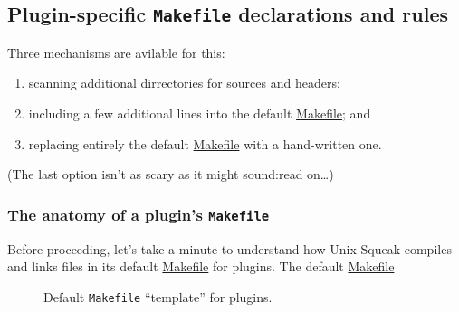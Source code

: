 \documentclass{article}
\newcommand{\cmd}{\url}
\newcommand{\cmd}{\texttt}
\begin{document}
\subsection{Plugin-specific \texttt{Makefile} declarations and rules}

Three
mechanisms are avilable for this:
\begin{enumerate}
\item scanning additional dirrectories for sources and headers;
\item including a few additional lines into the default \cmd{Makefile};
  and 
\item replacing entirely the default \cmd{Makefile} with a
  hand-written one.
\end{enumerate}
(The last option isn't as scary as it might sound:\@ read on\ldots)


\subsubsection{The anatomy of a plugin's \texttt{Makefile}}

Before proceeding, let's take a minute to understand how Unix Squeak
compiles and links files in its default \cmd{Makefile} for plugins.
The default
\cmd{Makefile}

\begin{figure}[ht]
\begin{quote}\begin{quote}
\end{quote}\end{quote}
\caption{Default \texttt{Makefile} ``template'' for plugins.\label{fig:mf-default}}
\end{figure}
\end{document}

